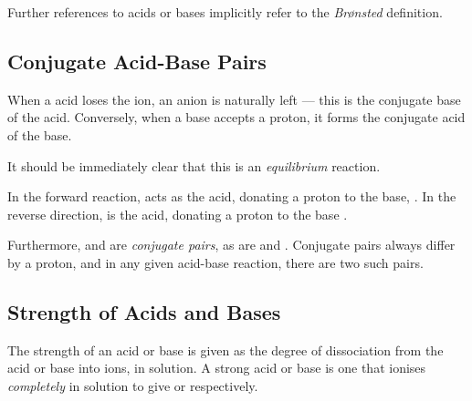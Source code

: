 			Further references to acids or bases implicitly refer to the \textit{Brønsted} definition.




		\pagebreak
		\subsection{Conjugate Acid-Base Pairs}

			When a acid loses the  ion, an anion is naturally left --- this is the conjugate base of the acid. Conversely, when a
			base accepts a proton, it forms the conjugate acid of the base.


			It should be immediately clear that this is an \textit{equilibrium} reaction.

			In the forward reaction,  acts as the acid, donating a proton to the base, . In the reverse direction,
			 is the acid, donating a proton to the base .

			 Furthermore,  and  are \textit{conjugate pairs}, as are  and . Conjugate pairs always
			 differ by a proton, and in any given acid-base reaction, there are two such pairs.



		\subsection{Strength of Acids and Bases}

			The strength of an acid or base is given as the degree of dissociation from the acid or base into ions, in solution. A strong acid
			or base is one that ionises \textit{completely} in solution to give  or  respectively.


